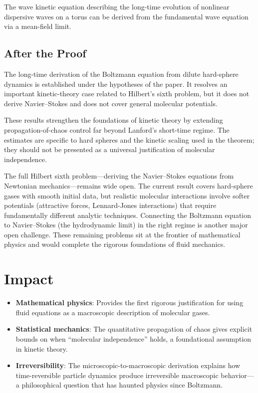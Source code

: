 \begin{theorem}[Deng, 2025]
The wave kinetic equation describing the long-time evolution of nonlinear dispersive waves on a torus can be derived from the fundamental wave equation via a mean-field limit.
\end{theorem}

\subsection{After the Proof}

The long-time derivation of the Boltzmann equation from dilute hard-sphere dynamics is established under the hypotheses of the paper. It resolves an important kinetic-theory case related to Hilbert's sixth problem, but it does not derive Navier--Stokes and does not cover general molecular potentials.

These results strengthen the foundations of kinetic theory by extending propagation-of-chaos control far beyond Lanford's short-time regime. The estimates are specific to hard spheres and the kinetic scaling used in the theorem; they should not be presented as a universal justification of molecular independence.

The full Hilbert sixth problem---deriving the Navier--Stokes equations from Newtonian mechanics---remains wide open. The current result covers hard-sphere gases with smooth initial data, but realistic molecular interactions involve softer potentials (attractive forces, Lennard-Jones interactions) that require fundamentally different analytic techniques. Connecting the Boltzmann equation to Navier--Stokes (the hydrodynamic limit) in the right regime is another major open challenge. These remaining problems sit at the frontier of mathematical physics and would complete the rigorous foundations of fluid mechanics.

\section{Impact}
\begin{itemize}
\item \textbf{Mathematical physics}: Provides the first rigorous justification for using fluid equations as a macroscopic description of molecular gases.
\item \textbf{Statistical mechanics}: The quantitative propagation of chaos gives explicit bounds on when ``molecular independence'' holds, a foundational assumption in kinetic theory.
\item \textbf{Irreversibility}: The microscopic-to-macroscopic derivation explains how time-reversible particle dynamics produce irreversible macroscopic behavior---a philosophical question that has haunted physics since Boltzmann.
\end{itemize}

